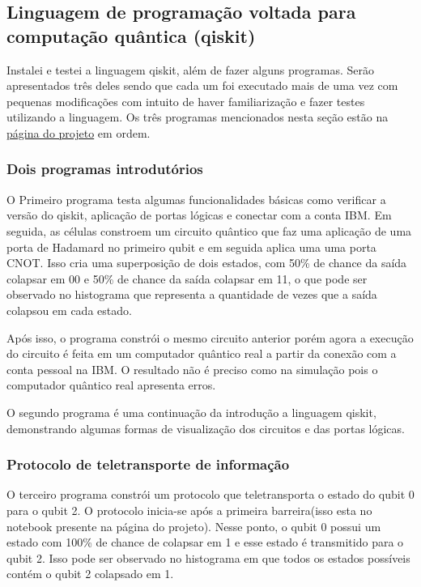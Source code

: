 \documentclass{article}
\begin{document}
    \subsection{Linguagem de programação voltada para computação quântica (qiskit)}
        Instalei e testei a linguagem qiskit, além de fazer alguns programas. Serão apresentados três deles sendo que cada um foi executado mais de uma vez com pequenas modificações com intuito de haver familiarização e fazer testes utilizando a linguagem. Os três programas mencionados nesta seção estão na \href{https://interscity.org/quantum-internet/}{página do projeto} em ordem.
    
        \subsubsection{Dois programas introdutórios}
        
        O Primeiro programa testa algumas funcionalidades básicas como verificar a versão do qiskit, aplicação de portas lógicas e conectar com a conta IBM. Em seguida, as células constroem um circuito quântico que faz uma aplicação de uma porta de Hadamard no primeiro qubit e em seguida aplica uma uma porta CNOT. Isso cria uma superposição de dois estados, com 50\% de chance da saída colapsar em 00 e 50\% de chance da saída colapsar em 11, o que pode ser observado no histograma que representa a quantidade de vezes que a saída colapsou em cada estado. 
        
        Após isso, o programa constrói o mesmo circuito anterior porém agora a execução do circuito é feita em um computador quântico real a partir da conexão com a conta pessoal na IBM. O resultado não é preciso como na simulação pois o computador quântico real apresenta erros. 
    
        O segundo programa é uma continuação da introdução a linguagem qiskit, demonstrando algumas formas de visualização dos circuitos e das portas lógicas.
        
        \subsubsection{Protocolo de teletransporte de informação}    
    
        O terceiro programa constrói um protocolo que teletransporta o estado do qubit 0 para o qubit 2. O protocolo inicia-se após a primeira barreira(isso esta no notebook presente na página do projeto). Nesse ponto, o qubit 0 possui um estado com 100\% de chance de colapsar em 1 e esse estado é transmitido para o qubit 2. Isso pode ser observado no histograma em que todos os estados possíveis contém o qubit 2 colapsado em 1.
\end{document}
